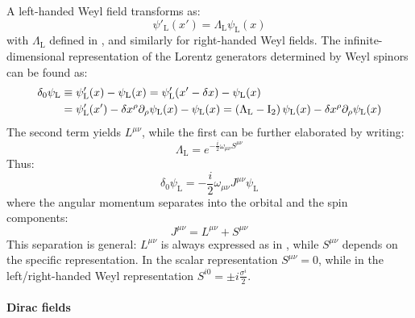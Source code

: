 A left-handed Weyl field transforms as:
\begin{equation}
  \psi'_\text{L}(x') = \Lambda_\text{L} \psi_\text{L}(x)
\end{equation}
with $ \Lambda_\text{L} $ defined in , and similarly for right-handed Weyl fields. The infinite-dimensional representation of the Lorentz generators determined by Weyl spinors can be found as:
\begin{equation*}
  \begin{split}
    \delta_0 \psi_\text{L} &\equiv \psi'_\text{L}(x) - \psi_\text{L}(x) = \psi'_\text{L}(x' - \delta x) - \psi_\text{L}(x) \\
                           &= \psi'_\text{L}(x') - \delta x^\rho \partial_\rho \psi_\text{L}(x) - \psi_\text{L}(x) = \left( \Lambda_\text{L} - \mathrm{I}_2 \right) \psi_\text{L}(x) - \delta x^\rho \partial_\rho \psi_\text{L}(x)
  \end{split}
\end{equation*}
The second term yields $ L^{\mu \nu} $, while the first can be further elaborated by writing:
\begin{equation}
  \Lambda_\text{L} = e^{-\frac{i}{2} \omega_{\mu \nu} S^{\mu \nu}}
\end{equation}
Thus:
\begin{equation*}
  \delta_0 \psi_\text{L} = - \frac{i}{2} \omega_{\mu \nu} J^{\mu \nu} \psi_\text{L}
\end{equation*}
where the angular momentum separates into the orbital and the spin components:
\begin{equation}
  J^{\mu \nu} = L^{\mu \nu} + S^{\mu \nu}
\end{equation}
This separation is general: $ L^{\mu \nu} $ is always expressed as in , while $ S^{\mu \nu} $ depends on the specific representation. In the scalar representation $ S^{\mu \nu} = 0 $, while in the left/right-handed Weyl representation $ S^{i0} = \pm i \frac{\sigma^i}{2} $.

\paragraph{Dirac fields}

